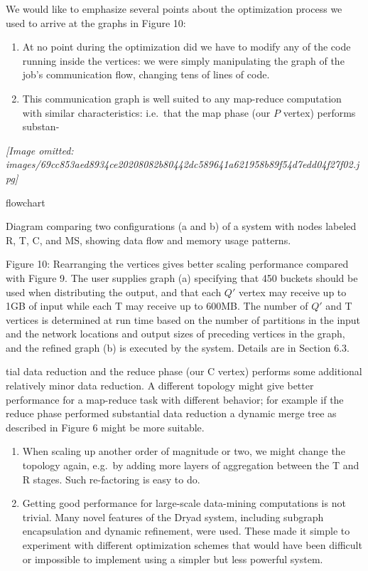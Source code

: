 \documentclass[
]{article}
\providecommand{\tightlist}{%
  \setlength{\itemsep}{0pt}\setlength{\parskip}{0pt}}
\begin{document}
We would like to emphasize several points about the optimization process
we used to arrive at the graphs in Figure 10:

\begin{enumerate}
\def\labelenumi{\arabic{enumi}.}
\tightlist
\item
  At no point during the optimization did we have to modify any of the
  code running inside the vertices: we were simply manipulating the
  graph of the job's communication flow, changing tens of lines of
  code.\\
\item
  This communication graph is well suited to any map-reduce computation
  with similar characteristics: i.e.~that the map phase (our \(P\)
  vertex) performs substan-
\end{enumerate}

\textit{[Image omitted: images/69cc853aed8934ce20208082b80442dc589641a621958b89f54d7edd04f27f02.jpg]}

flowchart

Diagram comparing two configurations (a and b) of a system with nodes
labeled R, T, C, and MS, showing data flow and memory usage patterns.

Figure 10: Rearranging the vertices gives better scaling performance
compared with Figure 9. The user supplies graph (a) specifying that 450
buckets should be used when distributing the output, and that each
\(Q'\) vertex may receive up to 1GB of input while each T may receive up
to 600MB. The number of \(Q'\) and T vertices is determined at run time
based on the number of partitions in the input and the network locations
and output sizes of preceding vertices in the graph, and the refined
graph (b) is executed by the system. Details are in Section 6.3.

tial data reduction and the reduce phase (our C vertex) performs some
additional relatively minor data reduction. A different topology might
give better performance for a map-reduce task with different behavior;
for example if the reduce phase performed substantial data reduction a
dynamic merge tree as described in Figure 6 might be more suitable.

\begin{enumerate}
\def\labelenumi{\arabic{enumi}.}
\setcounter{enumi}{2}
\tightlist
\item
  When scaling up another order of magnitude or two, we might change the
  topology again, e.g.~by adding more layers of aggregation between the
  T and R stages. Such re-factoring is easy to do.\\
\item
  Getting good performance for large-scale data-mining computations is
  not trivial. Many novel features of the Dryad system, including
  subgraph encapsulation and dynamic refinement, were used. These made
  it simple to experiment with different optimization schemes that would
  have been difficult or impossible to implement using a simpler but
  less powerful system.
\end{enumerate}
\end{document}

